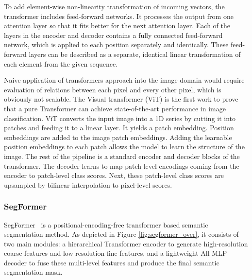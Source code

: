 To add element-wise non-linearity transformation of incoming vectors, 
the transformer includes feed-forward networks.
It processes the output from one attention layer so that it fits better for the next attention layer.
Each of the layers in the encoder and decoder contains a fully
connected feed-forward network, which is applied to each position separately and identically.
These feed-forward layers can be described as a separate, identical linear transformation of each element from the given sequence.

Naive application of transformers approach into the image domain would require evaluation of relations between each pixel and every other pixel, which is obviously not scalable. The Visual transformer (ViT) \cite{dosovitskiy2020image} is the first work to prove that a pure Transformer can achieve state-of-the-art performance in image classification. ViT converts the input image into a 1D series by cutting it into patches and feeding it to a linear layer. It yields a patch embedding. Position embeddings are added to the image patch embeddings. Adding the learnable position embeddings to each patch allows the model to learn the structure of the image. The rest of the pipeline is a standard encoder and decoder blocks of the transformer.  The decoder learns to map patch-level encodings coming from the encoder to patch-level class scores. Next, these patch-level class scores are upsampled by bilinear interpolation to pixel-level scores.

\subsubsection{SegFormer}
SegFormer~\cite{xie2021segformer} is a positional-encoding-free transformer based semantic segmentation method. As depicted in Figure \ref{fig:segformer_over}, it consists of two main modules: a hierarchical Transformer encoder to generate high-resolution coarse features and low-resolution fine features, and a lightweight All-MLP decoder to fuse these multi-level features and produce the final semantic segmentation mask. 

